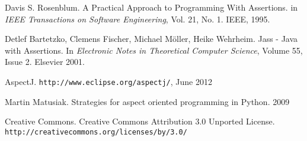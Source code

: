 \documentclass[a4paper,11pt]{article}
\begin{document}
\begin{thebibliography}{9}
	Davis S. Rosenblum.
	A Practical Approach to Programming With Assertions.
	in \emph{IEEE Transactions on Software Engineering}, Vol. 21, No. 1.
	IEEE, 1995.

	Detlef Bartetzko, Clemens Fischer, Michael Möller, Heike Wehrheim.
	Jass - Java with Assertions.
	In \emph{Electronic Notes in Theoretical Computer Science}, Volume 55, Issue 2.
	Elsevier 2001.

	AspectJ.
	\texttt{http://www.eclipse.org/aspectj/},
	June 2012

	Martin Matusiak.
	Strategies for aspect oriented programming in Python.
	2009

	Creative Commons.
	Creative Commons Attribution 3.0 Unported License.
	\texttt{http://creativecommons.org/licenses/by/3.0/}

\end{thebibliography}
\end{document}
